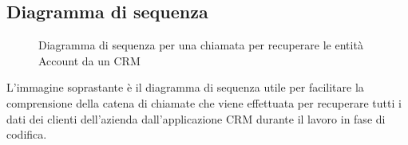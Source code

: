 \subsection{Diagramma di sequenza}
	\begin{figure}[H]
	\centering
	
	\caption{Diagramma di sequenza per una chiamata per recuperare le entità Account da un CRM }
	\label{fig:sdProposals}
\end{figure}

L'immagine soprastante è il diagramma di sequenza utile per facilitare la comprensione della catena di chiamate che viene effettuata per recuperare tutti i dati dei clienti dell'azienda dall'applicazione CRM durante il lavoro in fase di codifica.

